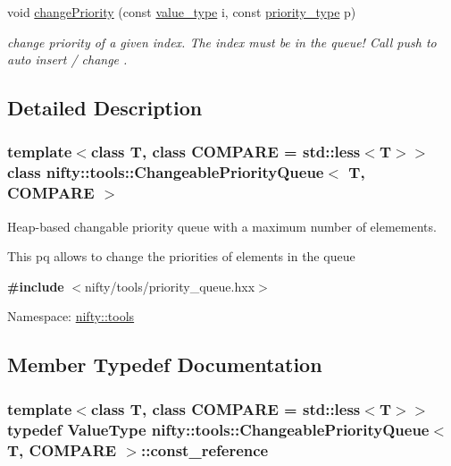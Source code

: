 \begin{DoxyCompactItemize}
void \hyperlink{classnifty_1_1tools_1_1ChangeablePriorityQueue_a5db5d4bd2d451623897e27c1aa5f8fff}{change\+Priority} (const \hyperlink{classnifty_1_1tools_1_1ChangeablePriorityQueue_aa00fbc748b94bdc6175b4c49bb2bba48}{value\+\_\+type} i, const \hyperlink{classnifty_1_1tools_1_1ChangeablePriorityQueue_a6ecafb387f99a1cfa7ff5795c924682c}{priority\+\_\+type} p)
\begin{DoxyCompactList}\small\item\em change priority of a given index. The index must be in the queue! Call push to auto insert / change . \end{DoxyCompactList}\end{DoxyCompactItemize}


\subsection{Detailed Description}
\subsubsection*{template$<$class T, class C\+O\+M\+P\+A\+R\+E = std\+::less$<$\+T$>$$>$class nifty\+::tools\+::\+Changeable\+Priority\+Queue$<$ T, C\+O\+M\+P\+A\+R\+E $>$}

Heap-\/based changable priority queue with a maximum number of elemements. 

This pq allows to change the priorities of elements in the queue

{\bfseries \#include} $<$nifty/tools/priority\+\_\+queue.\+hxx$>$~\newline


Namespace\+: \hyperlink{namespacenifty_1_1tools}{nifty\+::tools} 

\subsection{Member Typedef Documentation}
\hypertarget{classnifty_1_1tools_1_1ChangeablePriorityQueue_acb7eb23bd9ca7c52955adc06bf4816c3}{}
\subsubsection[{const\+\_\+reference}]{\setlength{\rightskip}{0pt plus 5cm}template$<$class T, class C\+O\+M\+P\+A\+R\+E = std\+::less$<$\+T$>$$>$ typedef {\bf Value\+Type} {\bf nifty\+::tools\+::\+Changeable\+Priority\+Queue}$<$ T, C\+O\+M\+P\+A\+R\+E $>$\+::{\bf const\+\_\+reference}}\label{classnifty_1_1tools_1_1ChangeablePriorityQueue_acb7eb23bd9ca7c52955adc06bf4816c3}
\hypertarget{classnifty_1_1tools_1_1ChangeablePriorityQueue_a6ecafb387f99a1cfa7ff5795c924682c}{}
